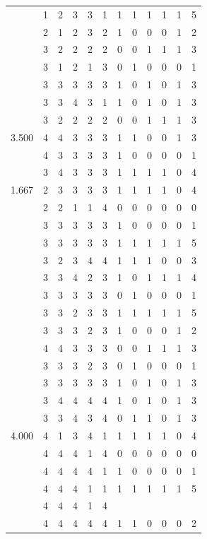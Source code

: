 \documentclass[]{msu-thesis}
\theoremstyle{definition}
\theoremstyle{definition}
\theoremstyle{definition}
\theoremstyle{remark}
\begin{document}
\begin{table}
{\begin{tabular}[t]{rrrrrrrrrrrr}
 & 1 & 2 & 3 & 3 & 1 & 1 & 1 & 1 & 1 & 1 & 5\\
 & 2 & 1 & 2 & 3 & 2 & 1 & 0 & 0 & 0 & 1 & 2\\
 & 3 & 2 & 2 & 2 & 2 & 0 & 0 & 1 & 1 & 1 & 3\\
 & 3 & 1 & 2 & 1 & 3 & 0 & 1 & 0 & 0 & 0 & 1\\
 & 3 & 3 & 3 & 3 & 3 & 1 & 0 & 1 & 0 & 1 & 3\\
 & 3 & 3 & 4 & 3 & 1 & 1 & 0 & 1 & 0 & 1 & 3\\
 & 3 & 2 & 2 & 2 & 2 & 0 & 0 & 1 & 1 & 1 & 3\\
3.500 & 4 & 4 & 3 & 3 & 3 & 1 & 1 & 0 & 0 & 1 & 3\\
 & 4 & 3 & 3 & 3 & 3 & 1 & 0 & 0 & 0 & 0 & 1\\
 & 3 & 4 & 3 & 3 & 3 & 1 & 1 & 1 & 1 & 0 & 4\\
1.667 & 2 & 3 & 3 & 3 & 3 & 1 & 1 & 1 & 1 & 0 & 4\\
 & 2 & 2 & 1 & 1 & 4 & 0 & 0 & 0 & 0 & 0 & 0\\
 & 3 & 3 & 3 & 3 & 3 & 1 & 0 & 0 & 0 & 0 & 1\\
 & 3 & 3 & 3 & 3 & 3 & 1 & 1 & 1 & 1 & 1 & 5\\
 & 3 & 2 & 3 & 4 & 4 & 1 & 1 & 1 & 0 & 0 & 3\\
 & 3 & 3 & 4 & 2 & 3 & 1 & 0 & 1 & 1 & 1 & 4\\
 & 3 & 3 & 3 & 3 & 3 & 0 & 1 & 0 & 0 & 0 & 1\\
 & 3 & 3 & 2 & 3 & 3 & 1 & 1 & 1 & 1 & 1 & 5\\
 & 3 & 3 & 3 & 2 & 3 & 1 & 0 & 0 & 0 & 1 & 2\\
 & 4 & 4 & 3 & 3 & 3 & 0 & 0 & 1 & 1 & 1 & 3\\
 & 3 & 3 & 3 & 2 & 3 & 0 & 1 & 0 & 0 & 0 & 1\\
 & 3 & 3 & 3 & 3 & 3 & 1 & 0 & 1 & 0 & 1 & 3\\
 & 3 & 4 & 4 & 4 & 4 & 1 & 0 & 1 & 0 & 1 & 3\\
 & 3 & 3 & 4 & 3 & 4 & 0 & 1 & 1 & 0 & 1 & 3\\
4.000 & 4 & 1 & 3 & 4 & 1 & 1 & 1 & 1 & 1 & 0 & 4\\
 & 4 & 4 & 4 & 1 & 4 & 0 & 0 & 0 & 0 & 0 & 0\\
 & 4 & 4 & 4 & 4 & 1 & 1 & 0 & 0 & 0 & 0 & 1\\
 & 4 & 4 & 4 & 1 & 1 & 1 & 1 & 1 & 1 & 1 & 5\\
 & 4 & 4 & 4 & 1 & 4 &  &  &  &  &  & \\
 & 4 & 4 & 4 & 4 & 4 & 1 & 1 & 0 & 0 & 0 & 2\\

\end{tabular}}
\end{table}
\end{document}
